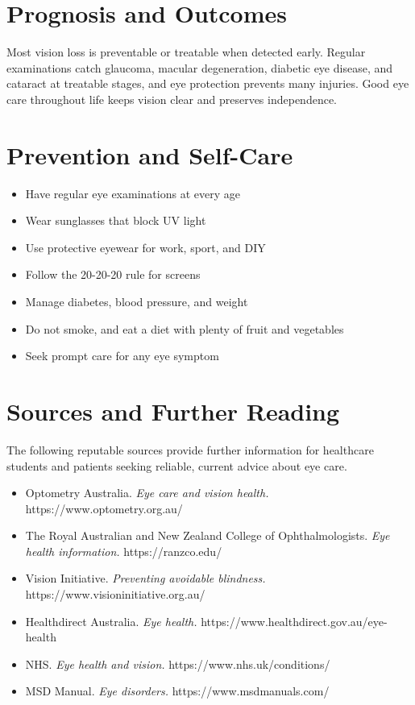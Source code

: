 \section*{Prognosis and Outcomes}
Most vision loss is preventable or treatable when detected early. Regular examinations catch glaucoma, macular degeneration, diabetic eye disease, and cataract at treatable stages, and eye protection prevents many injuries. Good eye care throughout life keeps vision clear and preserves independence.

\section*{Prevention and Self-Care}
\begin{itemize}
    \item Have regular eye examinations at every age
    \item Wear sunglasses that block UV light
    \item Use protective eyewear for work, sport, and DIY
    \item Follow the 20-20-20 rule for screens
    \item Manage diabetes, blood pressure, and weight
    \item Do not smoke, and eat a diet with plenty of fruit and vegetables
    \item Seek prompt care for any eye symptom
\end{itemize}

\section*{Sources and Further Reading}
The following reputable sources provide further information for healthcare students and patients seeking reliable, current advice about eye care.
\begin{itemize}
    \item Optometry Australia. \textit{Eye care and vision health.} https://www.optometry.org.au/
    \item The Royal Australian and New Zealand College of Ophthalmologists. \textit{Eye health information.} https://ranzco.edu/
    \item Vision Initiative. \textit{Preventing avoidable blindness.} https://www.visioninitiative.org.au/
    \item Healthdirect Australia. \textit{Eye health.} https://www.healthdirect.gov.au/eye-health
    \item NHS. \textit{Eye health and vision.} https://www.nhs.uk/conditions/
    \item MSD Manual. \textit{Eye disorders.} https://www.msdmanuals.com/
\end{itemize}
